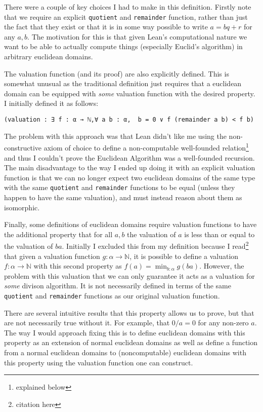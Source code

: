 \documentclass{article}
\newcommand{\N}{\ensuremath{\mathbb{N}}}
\renewcommand{\a}{\alpha}
\newcommand{\ct}{\texttt}
\begin{document}
There were a couple of key choices I had to make in this definition.
Firstly note that we require an explicit \ct{quotient} and \ct{remainder} function, rather than just the fact that they exist or that it is in some way possible to write $a=bq+r$ for any $a,b$.
The motivation for this is that given Lean's computational nature we want to be able to actually compute things (especially Euclid's algorithm) in arbitrary euclidean domains.

The valuation function (and its proof) are also explicitly defined. This is somewhat unusual as the traditional definition just requires that a euclidean domain can be equipped with \textit{some} valuation function with the desired property. I initially defined it as follows:
\begin{lstlisting}
(valuation : ∃ f : α → ℕ,∀ a b : α,  b = 0 ∨ f (remainder a b) < f b)
\end{lstlisting}
The problem with this approach was that Lean didn't like me using the non-constructive axiom of choice to define a non-computable well-founded relation\footnote{explained below} and thus I couldn't prove the Euclidean Algorithm was a well-founded recursion. 
The main disadvantage to the way I ended up doing it with an explicit valuation function is that we can no longer expect two euclidean domains of the same type with the same \ct{quotient} and \ct{remainder} functions to be equal (unless they happen to have the same valuation), and must instead reason about them as isomorphic.

Finally, some definitions of euclidean domains require valuation functions to have the additional property that for all $a,b$ the valuation of $a$ is less than or equal to the valuation of $ba$. 
Initially I excluded this from my definition because I read\footnote{citation here} that given a valuation function $g:\a \to \N$, it is possible to define a valuation $f:\a \to \N$ with this second property as $f(a)=\min_{b:\a}g(ba)$.
However, the problem with this valuation that we can only guarantee it acts as a valuation for \textit{some} divison algorithm.
It is not necessarily defined in terms of the same \ct{quotient} and \ct{remainder} functions as our original valuation function.

There are several intuitive results that this property allows us to prove, but that are not necessarily true without it.
For example, that $0/a=0$ for any non-zero $a$.
The way I would approach fixing this is to define euclidean domains with this property as an extension of normal euclidean domains as well as define a function from a normal euclidean domains to (noncomputable) euclidean domains with this property using the valuation function one can construct.
\end{document}
